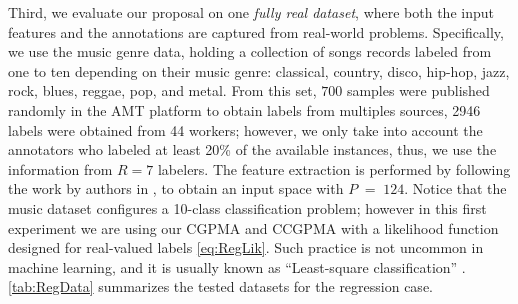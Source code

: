 \documentclass[journal]{IEEEtran}
\DeclareMathOperator{\igual}{\!\,=\!\,}
\begin{document}
Third, we evaluate our proposal on one \textit{fully real dataset}, where both the input features and the annotations are captured from real-world problems. Specifically, we use the music genre data, holding a collection of songs records labeled from one to ten depending on their music genre: classical, country, disco, hip-hop, jazz, rock, blues, reggae, pop, and metal. From this set, $700$ samples were published randomly in the AMT platform to obtain labels from multiples sources, 2946 labels were obtained from 44 workers; however, we only take into account the annotators who labeled at least 20\% of the available instances, thus, we use the information from $R = 7$ labelers. The feature extraction is performed by following the work by authors in \cite{rodrigues2013learning}, to obtain an input space with $P\igual124$. Notice that the music dataset configures a 10-class classification problem; however in this first experiment we are using our CGPMA and CCGPMA with a likelihood function designed for real-valued labels \cref{eq:RegLik}. Such practice is not uncommon in machine learning, and it is usually known as ``Least-square classification'' \cite{rasmussen2006gaussian}. \cref{tab:RegData} summarizes the tested datasets for the regression case.
\begin{table}[!tb]
	\caption{Datasets for regression.
	}
	\label{tab:RegData}
	\centering
\end{table}
\end{document}
